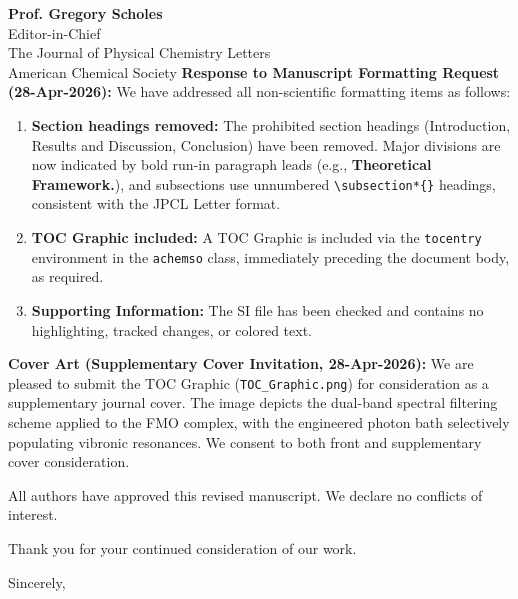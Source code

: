 \documentclass[11pt,a4paper]{letter}
\begin{document}
\begin{letter}{
\textbf{Prof. Gregory Scholes}\\
Editor-in-Chief\\
The Journal of Physical Chemistry Letters\\
American Chemical Society
}
\textbf{Response to Manuscript Formatting Request (28-Apr-2026):}
We have addressed all non-scientific formatting items as follows:
\begin{enumerate}
\item \textbf{Section headings removed:} The prohibited section headings (Introduction, Results and Discussion, Conclusion) have been removed. Major divisions are now indicated by bold run-in paragraph leads (e.g., \textbf{Theoretical Framework.}), and subsections use unnumbered \texttt{\textbackslash subsection*\{\}} headings, consistent with the JPCL Letter format.
\item \textbf{TOC Graphic included:} A TOC Graphic is included via the \texttt{tocentry} environment in the \texttt{achemso} class, immediately preceding the document body, as required.
\item \textbf{Supporting Information:} The SI file has been checked and contains no highlighting, tracked changes, or colored text.
\end{enumerate}

\textbf{Cover Art (Supplementary Cover Invitation, 28-Apr-2026):}
We are pleased to submit the TOC Graphic (\texttt{TOC\_Graphic.png}) for consideration as a supplementary journal cover. The image depicts the dual-band spectral filtering scheme applied to the FMO complex, with the engineered photon bath selectively populating vibronic resonances. We consent to both front and supplementary cover consideration.

All authors have approved this revised manuscript. We declare no conflicts of interest.

Thank you for your continued consideration of our work.

\closing{Sincerely,}


\end{letter}
\end{document}
